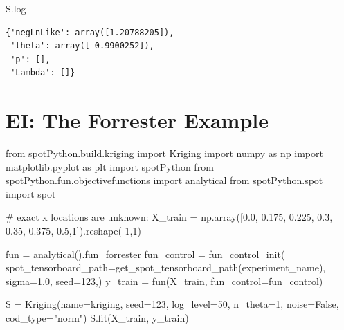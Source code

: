 \documentclass[
  letterpaper,
  DIV=11,
  numbers=noendperiod]{scrreprt}
\newenvironment{Shaded}{\begin{snugshade}}{\end{snugshade}}
\newcommand{\CommentTok}[1]{\textcolor[rgb]{0.37,0.37,0.37}{#1}}
\newcommand{\DecValTok}[1]{\textcolor[rgb]{0.68,0.00,0.00}{#1}}
\newcommand{\FloatTok}[1]{\textcolor[rgb]{0.68,0.00,0.00}{#1}}
\newcommand{\ImportTok}[1]{\textcolor[rgb]{0.00,0.46,0.62}{#1}}
\newcommand{\NormalTok}[1]{\textcolor[rgb]{0.00,0.23,0.31}{#1}}
\newcommand{\OperatorTok}[1]{\textcolor[rgb]{0.37,0.37,0.37}{#1}}
\newcommand{\StringTok}[1]{\textcolor[rgb]{0.13,0.47,0.30}{#1}}
\newcommand{\VariableTok}[1]{\textcolor[rgb]{0.07,0.07,0.07}{#1}}
\begin{document}
\begin{Shaded}
\begin{Highlighting}[]
\NormalTok{S.log}
\end{Highlighting}
\end{Shaded}

\begin{verbatim}
{'negLnLike': array([1.20788205]),
 'theta': array([-0.9900252]),
 'p': [],
 'Lambda': []}
\end{verbatim}

\hypertarget{ei-the-forrester-example}{%
\section{EI: The Forrester Example}\label{ei-the-forrester-example}}

\begin{Shaded}
\begin{Highlighting}[]
\ImportTok{from}\NormalTok{ spotPython.build.kriging }\ImportTok{import}\NormalTok{ Kriging}
\ImportTok{import}\NormalTok{ numpy }\ImportTok{as}\NormalTok{ np}
\ImportTok{import}\NormalTok{ matplotlib.pyplot }\ImportTok{as}\NormalTok{ plt}
\ImportTok{import}\NormalTok{ spotPython}
\ImportTok{from}\NormalTok{ spotPython.fun.objectivefunctions }\ImportTok{import}\NormalTok{ analytical}
\ImportTok{from}\NormalTok{ spotPython.spot }\ImportTok{import}\NormalTok{ spot}

\CommentTok{\# exact x locations are unknown:}
\NormalTok{X\_train }\OperatorTok{=}\NormalTok{ np.array([}\FloatTok{0.0}\NormalTok{, }\FloatTok{0.175}\NormalTok{, }\FloatTok{0.225}\NormalTok{, }\FloatTok{0.3}\NormalTok{, }\FloatTok{0.35}\NormalTok{, }\FloatTok{0.375}\NormalTok{, }\FloatTok{0.5}\NormalTok{,}\DecValTok{1}\NormalTok{]).reshape(}\OperatorTok{{-}}\DecValTok{1}\NormalTok{,}\DecValTok{1}\NormalTok{)}

\NormalTok{fun }\OperatorTok{=}\NormalTok{ analytical().fun\_forrester}
\NormalTok{fun\_control }\OperatorTok{=}\NormalTok{ fun\_control\_init(}
\NormalTok{    spot\_tensorboard\_path}\OperatorTok{=}\NormalTok{get\_spot\_tensorboard\_path(experiment\_name),}
\NormalTok{    sigma}\OperatorTok{=}\FloatTok{1.0}\NormalTok{,}
\NormalTok{    seed}\OperatorTok{=}\DecValTok{123}\NormalTok{,)}
\NormalTok{y\_train }\OperatorTok{=}\NormalTok{ fun(X\_train, fun\_control}\OperatorTok{=}\NormalTok{fun\_control)}

\NormalTok{S }\OperatorTok{=}\NormalTok{ Kriging(name}\OperatorTok{=}\StringTok{\textquotesingle{}kriging\textquotesingle{}}\NormalTok{,  seed}\OperatorTok{=}\DecValTok{123}\NormalTok{, log\_level}\OperatorTok{=}\DecValTok{50}\NormalTok{, n\_theta}\OperatorTok{=}\DecValTok{1}\NormalTok{, noise}\OperatorTok{=}\VariableTok{False}\NormalTok{, cod\_type}\OperatorTok{=}\StringTok{"norm"}\NormalTok{)}
\NormalTok{S.fit(X\_train, y\_train)}


\end{Highlighting}
\end{Shaded}
\end{document}
